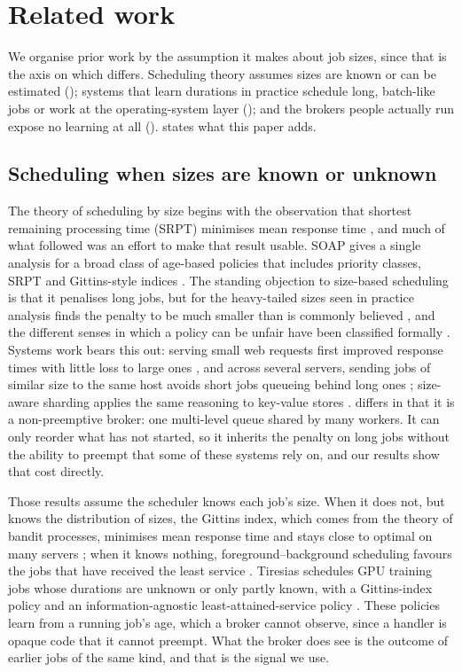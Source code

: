 \section{Related work}\label{sec:related}

We organise prior work by the assumption it makes about job sizes, since that is the axis on which \sys{} differs. Scheduling theory assumes sizes are known or can be estimated (); systems that learn durations in practice schedule long, batch-like jobs or work at the operating-system layer
(); and the brokers people actually run expose no learning at all ().  states what this paper adds.

\subsection{Scheduling when sizes are known or unknown}\label{sec:rw-known}

The theory of scheduling by size begins with the observation that shortest remaining processing time (SRPT) minimises mean response time \citep{schrage1968}, and much of what followed was an effort to make that result usable. SOAP gives a single analysis for a broad class of age-based policies that includes priority classes, SRPT and Gittins-style indices
\citep{scully2018soap}. The standing objection to size-based scheduling is that it penalises long jobs, but for the heavy-tailed sizes seen in practice analysis finds the penalty to be much smaller than is commonly believed \citep{bansal2001}, and the different senses in which a policy can be unfair have been classified formally \citep{wierman2003}. Systems work bears this out: serving small web requests
first improved response times with little loss to large ones \citep{harchol2003}, and across several servers, sending jobs of similar size to the same host avoids short jobs queueing behind long ones \citep{harchol1999sita}; size-aware sharding applies the same reasoning to key-value stores \citep{didona2019minos}. \sys{} differs in that it is a non-preemptive broker: one multi-level queue shared by many workers. It can only reorder what has not started, so it inherits the
penalty on long jobs without the ability to preempt that some of these systems rely on, and our results show that cost directly.

Those results assume the scheduler knows each job's size. When it does not, but knows the distribution of sizes, the Gittins index, which comes from the theory of bandit processes, minimises mean response time \citep{gittins1979} and stays close to optimal on many servers \citep{scully2020gittins}; when it knows nothing, foreground--background scheduling favours the jobs that have received the least service \citep{nuyens2008}. Tiresias schedules GPU training jobs whose durations are unknown or only partly known, with a Gittins-index policy and an information-agnostic least-attained-service policy
\citep{gu2019tiresias}. These policies learn from a running job's age, which a broker cannot observe, since a handler is opaque code that it cannot preempt. What the broker does see is the outcome of earlier jobs of the same kind, and that is the signal we use.


